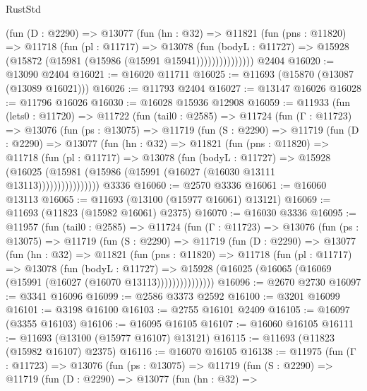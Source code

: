 \begin{lexlean}{RustStd}
\begin{coremodule}
                (fun (D : @2290) =>
                @13077
                  (fun (hn : @32) =>
                  @11821
                    (fun (pns : @11820) =>
                    @11718
                      (fun (pl : @11717) =>
                      @13078
                        (fun (bodyL : @11727) =>
                        @15928 (@15872 (@15981 (@15986 (@15991 @15941)))))))))))))))
    @2404
@16020 := @13090 @2404
@16021 := @16020 @11711
@16025 := @11693 (@15870 (@13087 (@13089 @16021)))
@16026 := @11793 @2404
@16027 := @13147 @16026
@16028 := @11796 @16026
@16030 := @16028 @15936 @12908
@16059 := @11933
    (fun (lets0 : @11720) =>
    @11722
      (fun (tail0 : @2585) =>
      @11724
        (fun (Γ : @11723) =>
        @13076
          (fun (ps : @13075) =>
          @11719
            (fun (S : @2290) =>
            @11719
              (fun (D : @2290) =>
              @13077
                (fun (hn : @32) =>
                @11821
                  (fun (pns : @11820) =>
                  @11718
                    (fun (pl : @11717) =>
                    @13078
                      (fun (bodyL : @11727) =>
                      @15928
                        (@16025
                          (@15981 (@15986 (@15991 (@16027 (@16030 @13111 @13113))))))))))))))))
    @3336
@16060 := @2570 @3336
@16061 := @16060 @13113
@16065 := @11693 (@13100 (@15977 @16061) @13121)
@16069 := @11693 (@11823 (@15982 @16061) @2375)
@16070 := @16030 @3336
@16095 := @11957
    (fun (tail0 : @2585) =>
    @11724
      (fun (Γ : @11723) =>
      @13076
        (fun (ps : @13075) =>
        @11719
          (fun (S : @2290) =>
          @11719
            (fun (D : @2290) =>
            @13077
              (fun (hn : @32) =>
              @11821
                (fun (pns : @11820) =>
                @11718
                  (fun (pl : @11717) =>
                  @13078
                    (fun (bodyL : @11727) =>
                    @15928 (@16025 (@16065 (@16069 (@15991 (@16027 (@16070 @13113)))))))))))))))
@16096 := @2670 @2730
@16097 := @3341 @16096
@16099 := @2586 @3373 @2592
@16100 := @3201 @16099
@16101 := @3198 @16100
@16103 := @2755 @16101 @2409
@16105 := @16097 (@3355 @16103)
@16106 := @16095 @16105
@16107 := @16060 @16105
@16111 := @11693 (@13100 (@15977 @16107) @13121)
@16115 := @11693 (@11823 (@15982 @16107) @2375)
@16116 := @16070 @16105
@16138 := @11975
    (fun (Γ : @11723) =>
    @13076
      (fun (ps : @13075) =>
      @11719
        (fun (S : @2290) =>
        @11719
          (fun (D : @2290) =>
          @13077
            (fun (hn : @32) =>

\end{coremodule}
\end{lexlean}
